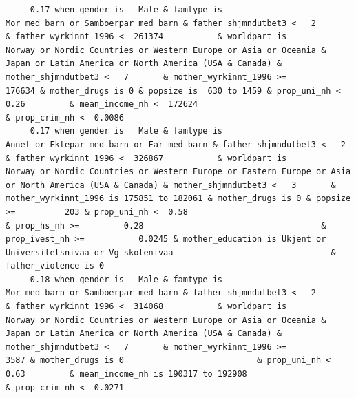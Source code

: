 \documentclass[
  letterpaper,
  DIV=11,
  numbers=noendperiod]{scrreprt}
\begin{document}
\begin{verbatim}
     0.17 when gender is   Male & famtype is                              Mor med barn or Samboerpar med barn & father_shjmndutbet3 <   2       & father_wyrkinnt_1996 <  261374           & worldpart is            Norway or Nordic Countries or Western Europe or Asia or Oceania & Japan or Latin America or North America (USA & Canada) & mother_shjmndutbet3 <   7       & mother_wyrkinnt_1996 >=           176634 & mother_drugs is 0 & popsize is  630 to 1459 & prop_uni_nh <  0.26         & mean_income_nh <  172624                                        & prop_crim_nh <  0.0086                                                                                                                                                                                                                                                                                      
     0.17 when gender is   Male & famtype is                        Annet or Ektepar med barn or Far med barn & father_shjmndutbet3 <   2       & father_wyrkinnt_1996 <  326867           & worldpart is                              Norway or Nordic Countries or Western Europe or Eastern Europe or Asia or North America (USA & Canada) & mother_shjmndutbet3 <   3       & mother_wyrkinnt_1996 is 175851 to 182061 & mother_drugs is 0 & popsize >=          203 & prop_uni_nh <  0.58                                              & prop_hs_nh >=         0.28                                    & prop_ivest_nh >=           0.0245 & mother_education is Ukjent or Universitetsnivaa or Vg skolenivaa                                & father_violence is 0                                                                                                               
     0.18 when gender is   Male & famtype is                              Mor med barn or Samboerpar med barn & father_shjmndutbet3 <   2       & father_wyrkinnt_1996 <  314068           & worldpart is            Norway or Nordic Countries or Western Europe or Asia or Oceania & Japan or Latin America or North America (USA & Canada) & mother_shjmndutbet3 <   7       & mother_wyrkinnt_1996 >=             3587 & mother_drugs is 0                           & prop_uni_nh <  0.63         & mean_income_nh is 190317 to 192908                              & prop_crim_nh <  0.0271                                                                                                                                                                                                                                                                                      

\end{verbatim}
\end{document}
